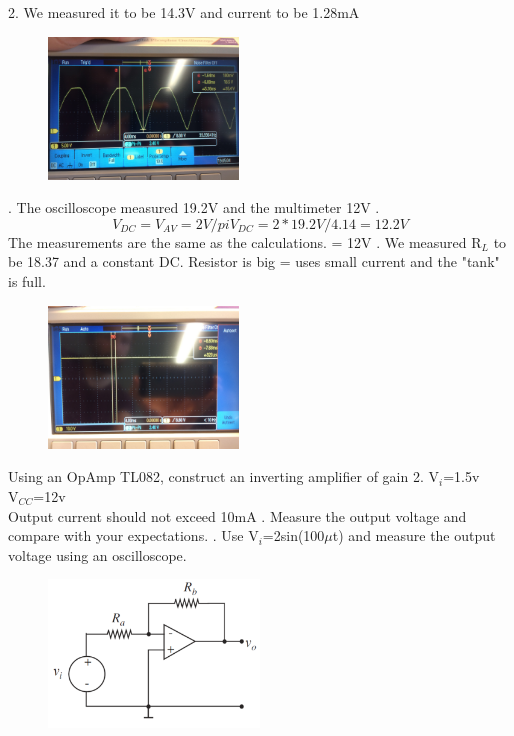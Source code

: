 {	\begin{solution}
		2. We measured it to be 14.3V and current to be 1.28mA
		\begin{figure}[h!]
			\centering
			\includegraphics[width=0.45\textwidth]{images/plot323.jpg}
		\end{figure}
		. The oscilloscope measured 19.2V and the multimeter 12V
		. \[ V_{DC}=V_{AV}=2V/pi 
			  V_{DC}=2*19.2V/4.14=12.2V		\]
		The measurements are the same as the calculations. = 12V 		
		. We measured R\(_{L}\) to be 18.37 and a constant DC. Resistor is big = uses small current and the "tank" is full.
		\begin{figure}[h!]
			\centering
			\includegraphics[width=0.45\textwidth]{images/plot325.jpg}
		\end{figure}
	\end{solution}
	\clearpage
	\begin{problem}
		Using an OpAmp TL082, construct an inverting amplifier of gain 2.
		\newline
		V\(_{i}\)=1.5v\\
		V\(_{CC}\)=12v\\
		Output current should not exceed 10mA
		. Measure the output voltage and compare with your expectations.
		. Use V\(_{i}\)=2sin(100\(\mu\)t) and measure the output voltage using an oscilloscope.
		\begin{figure}[h!]
			\centering
			\includegraphics[width=0.5\textwidth]{images/circuit3.png}
		\end{figure}
	\end{problem}
	
}
